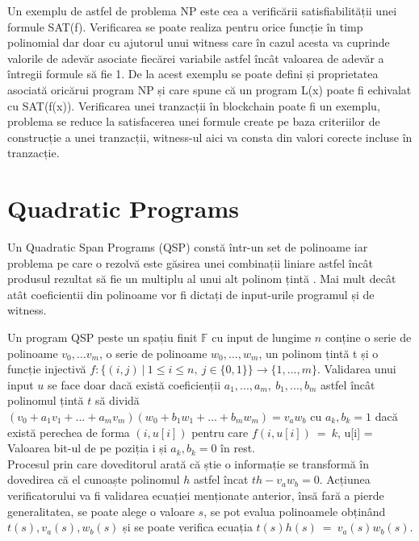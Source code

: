 Un exemplu de astfel de problema NP este cea a verificării satisfiabilității unei formule SAT(f). Verificarea se poate realiza pentru orice funcție în timp polinomial dar doar cu ajutorul unui witness care în cazul acesta va cuprinde valorile de adevăr asociate fiecărei variabile astfel încât valoarea de adevăr a întregii formule să fie 1. De la acest exemplu se poate defini și proprietatea asociată oricărui program NP și care spune că un program L(x) poate fi echivalat cu SAT(f(x)). Verificarea unei tranzacții în blockchain poate fi un exemplu, problema se reduce la satisfacerea unei formule create pe baza criteriilor de construcție a unei tranzacții, witness-ul aici va consta din valori corecte incluse în tranzacție.\\

\section{Quadratic Programs}

Un Quadratic Span Programs (QSP) constă într-un set de polinoame iar problema pe care o rezolvă este găsirea unei combinații liniare astfel încât produsul rezultat să fie un multiplu al unui alt polinom țintă \cite{ZKS_Crypto_Basic2}. Mai mult decât atât coeficientii din polinoame vor fi dictați de input-urile programul și de witness.

Un program QSP peste un spațiu finit $\mathbb{F}$ cu input de lungime $n$ conține o serie de polinoame $v_0,...v_m$, o serie de polinoame $w_0,...,w_m$, un polinom țintă t și o funcție injectivă $f:\{(i,j) \ | \ 1 \leq i \leq n, \  j \in \{0,1\}\}\rightarrow\{1,...,m\}$.
Validarea unui input $u$ se face doar dacă există coeficienții $a_1,...,a_m,\ b_1,...,b_m$ astfel încât polinomul țintă $t$ să dividă $(v_0 + a_1v_1 + ... + a_mv_m)(w_0 + b_1w_1 + ... + b_mw_m) = v_aw_b$ cu $a_k,b_k = 1$ dacă există perechea de forma $(i,u[i])$ pentru care $f(i,u[i])\ =\ k$, u[i] = Valoarea bit-ul de pe poziția i și $a_k,b_k = 0$ în rest.\\

Procesul prin care doveditorul arată că știe o informație se transformă în dovedirea că el cunoaște polinomul $h$ astfel încat $th-v_aw_b=0$. Acțiunea verificatorului va fi validarea ecuației menționate anterior, însă fară a pierde generalitatea, se poate alege o valoare $s$, se pot evalua polinoamele obținând $t(s),v_a(s),w_b(s)$ și se poate verifica ecuația $t(s)h(s)\ =\ v_a(s)w_b(s)$.\\

